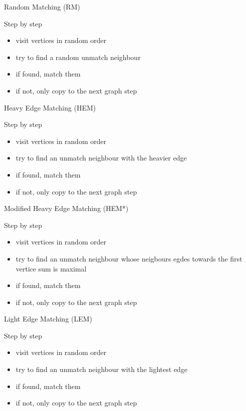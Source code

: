 \documentclass{beamer}
\begin{document}
\begin{frame}{Random Matching (RM)}
	\begin{block}{Step by step}
		 \begin{itemize}
			\item visit vertices in random order
			\item try to find a random unmatch neighbour
			\item if found, match them
			\item if not, only copy to the next graph step
		 \end{itemize}
	\end{block}
\end{frame}


\begin{frame}{Heavy Edge Matching (HEM)}
	\begin{block}{Step by step}
		 \begin{itemize}
			\item visit vertices in random order
			\item try to find an unmatch neighbour with the heavier edge
			\item if found, match them
			\item if not, only copy to the next graph step
		 \end{itemize}
	\end{block}
\end{frame}


\begin{frame}{Modified Heavy Edge Matching (HEM*)}
	\begin{block}{Step by step}
		 \begin{itemize}
			\item visit vertices in random order
			\item try to find an unmatch neighbour whose neigbours egdes towards the first vertice sum is maximal
			\item if found, match them
			\item if not, only copy to the next graph step
		 \end{itemize}
	\end{block}
\end{frame}


\begin{frame}{Light Edge Matching (LEM)}
	\begin{block}{Step by step}
		 \begin{itemize}
			\item visit vertices in random order
			\item try to find an unmatch neighbour with the lightest edge
			\item if found, match them
			\item if not, only copy to the next graph step
		 \end{itemize}
	\end{block}
\end{frame}
\end{document}
